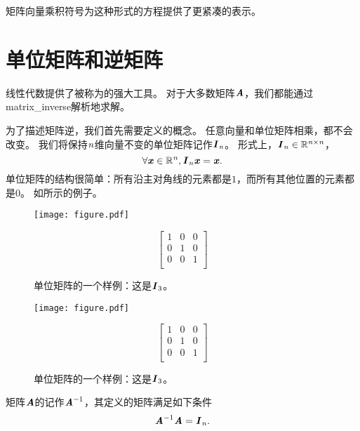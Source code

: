 矩阵向量乘积符号为这种形式的方程提供了更紧凑的表示。





\section{单位矩阵和逆矩阵}
\label{sec:identity_and_inverse_atrices}


线性代数提供了被称为的强大工具。
对于大多数矩阵$\boldsymbol{\mathit{A}}$，我们都能通过\gls{matrix_inverse}解析地求解。


为了描述矩阵逆，我们首先需要定义的概念。
任意向量和单位矩阵相乘，都不会改变。
我们将保持$\mathit{n}$维向量不变的单位矩阵记作$\boldsymbol{\mathit{I}}_{\mathit{n}}$。
形式上，$\boldsymbol{\mathit{I}}_{\mathit{n}}\in \mathbb{R}^{\mathit{n}\times \mathit{n}}$，
\begin{equation}
    \forall \boldsymbol{\mathit{x}} \in \mathbb{R}^{\mathit{n}}, \boldsymbol{\mathit{I}}_{\mathit{n}} \boldsymbol{\mathit{x}} = \boldsymbol{\mathit{x}}.
\end{equation}
单位矩阵的结构很简单：所有沿主对角线的元素都是$1$，而所有其他位置的元素都是$0$。
如所示的例子。
\begin{figure}[!htb]
\ifOpenSource
\centerline{\texttt{[image: figure.pdf]}}
\else
\centering
\begin{equation*}
\begin{bmatrix} 
1 & 0 & 0 \\
0 & 1 & 0 \\
0 & 0 & 1 \\
\end{bmatrix}
\end{equation*}
\fi
\caption{单位矩阵的一个样例：这是$\boldsymbol{\mathit{I}}_3$。}
\label{fig:chap2_empty2}
\end{figure}

\begin{figure}[!htb]
\ifOpenSource
\centerline{\texttt{[image: figure.pdf]}}
\else
\centering
\begin{equation}
\begin{bmatrix} 
1 & 0 & 0 \\
0 & 1 & 0 \\
0 & 0 & 1 \\
\end{bmatrix}
\end{equation}
\fi
\caption{单位矩阵的一个样例：这是$\boldsymbol{\mathit{I}}_3$。}
\label{fig:chap2_empty2}
\end{figure}

矩阵$\boldsymbol{\mathit{A}}$的记作$\boldsymbol{\mathit{A}}^{-1}$，其定义的矩阵满足如下条件
\begin{equation} \boldsymbol{\mathit{A}}^{-1}\boldsymbol{\mathit{A}} = \boldsymbol{\mathit{I}}_{\mathit{n}}. \end{equation}

